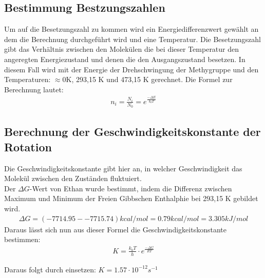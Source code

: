 \subsection{Bestimmung Bestzungszahlen}

Um auf die Besetzungszahl zu kommen wird ein Energiedifferenzwert gewählt an dem die Berechnung durchgeführt wird und eine Temperatur. Die Besetzungszahl gibt das Verhältnis zwischen den Molekülen die bei dieser Temperatur den angeregten Energiezustand und denen die den Ausgangszustand besetzen.
In diesem Fall wird mit der Energie der Drehschwingung der Methygruppe und den Temperaturen: $\approx$0K, 293,15 K und 473,15 K gerechnet.
Die Formel zur Berechnung lautet:
\begin{align}
    n_i = \frac{N_i}{N_0} = e^{\frac{-\Delta E}{k_b T}}
\end{align}


\subsection{Berechnung der Geschwindigkeitskonstante der Rotation}

Die Geschwindigkeitskonstante gibt hier an, in welcher Geschwindigkeit das Molekül zwischen den Zuständen fluktuiert. \\
Der $\Delta G$-Wert von Ethan wurde bestimmt, indem die Differenz zwischen Maximum und Minimum der Freien Gibbschen Enthalphie bei 293,15 K gebildet wird.
\begin{align*}
    \Delta G = (-7714.95 - -7715.74) kcal/mol = 0.79 kcal/mol = 3.305 kJ/mol  
\end{align*}
Daraus lässt sich nun aus dieser Formel die Geschwindigkeitskonstante bestimmen:
\begin{align}
    K = \frac{k_b T}{h} \cdot e^{\frac{- \Delta G}{RT}}
\end{align}

Daraus folgt durch einsetzen: $K = 1.57 \cdot 10^{-12} s^{-1}$
